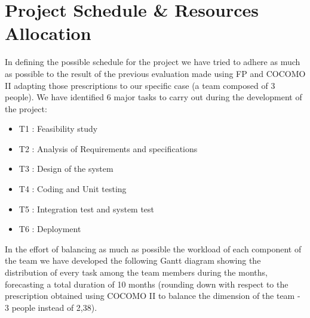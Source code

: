 \chapter{Project Schedule \& Resources Allocation} \label{chap4}
In defining the possible schedule for the project we have tried to adhere as much as possible to the result of the previous evaluation made using FP and COCOMO II adapting those prescriptions to our specific case (a team composed of 3 people).
We have identified 6 major tasks to carry out during the development of the project:
\begin{itemize}
	\item T1 : Feasibility study
	\item T2 : Analysis of Requirements and specifications
	\item T3 : Design of the system
	\item T4 : Coding and Unit testing
	\item T5 : Integration test and system test
	\item T6 : Deployment
\end{itemize}
In the effort of balancing as much as possible the workload of each component of the team we have developed the following Gantt diagram showing the distribution of every task among the team members during the months, forecasting a total duration of 10 months (rounding down with respect to the prescription obtained using COCOMO II to balance the dimension of the team - 3 people instead of 2,38).